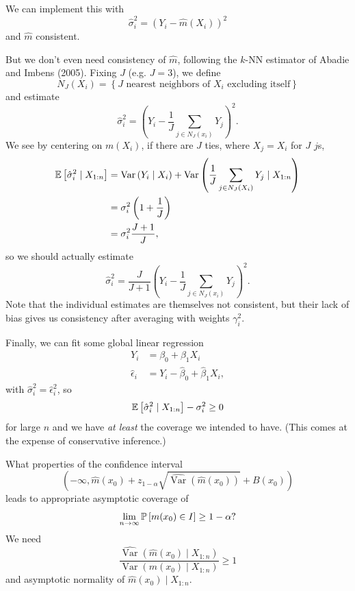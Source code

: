 \begin{example}	We can implement this with \[
		\hat{\sigma}_i^2 = \left( Y_i - \hat{m}(X_i) \right)^2
	\]  and $\hat{m}$ consistent.

	But we don't even need consistency of $\hat{m}$, following the $k$-NN estimator of Abadie and Imbens (2005). Fixing $J$ (e.g. $J=3$), we define \[
		N_J(X_i) = \left\{J \text{ nearest neighbors of $X_i$ excluding itself}\right\}
	\] and estimate \[
		\hat{\sigma}_i^2 = \left( Y_i - \frac{1}{J} \sum\limits_{j\in N_J(x_i)}^{} Y_j \right)^2
	.\] We see by centering on $m(X_i)$, if there are $J$ ties, where $X_j = X_i$ for $J$ $j$s,
	\begin{align*}
		\E\left[\hat{\sigma}_i^2 \mid X_{1:n}\right]
		&= \operatorname{Var}\left(Y_i \mid X_i\right) + \operatorname{Var}\left(\frac{1}{J} \sum\limits_{j \in N_J(X_i)}^{} Y_j \mid X_{1:n}\right)\\
		&= \sigma_i^2 \left( 1 + \frac{1}{J} \right) \\
		&= \sigma_i^2 \frac{J+1}{J}
	,\end{align*}
	so we should actually estimate \[
		\hat{\sigma}_i^2 = \frac{J}{J+1} \left( Y_i - \frac{1}{J} \sum\limits_{j\in N_J(x_i)}^{} Y_j \right)^2
	.\] 
	Note that the individual estimates are themselves not consistent, but their lack of bias gives us consistency after averaging with weights $\gamma_i^2$.


	Finally, we can fit some global linear regression 
	\begin{align*}
		Y_i &= \beta_0 + \beta_1 X_i \\
		\hat{\epsilon}_i &= Y_i - \hat{\beta}_0 + \hat{\beta}_1X_i
	,\end{align*}
	with $\hat{\sigma}_i^2 = \hat{\epsilon}_i^2$, so \[
		\E\left[\hat{\sigma}_i^2 \mid X_{1:n}\right] - \sigma_i^2 \ge 0
	\] for large $n$ and we have \emph{at least} the coverage we intended to have. (This comes at the expense of conservative inference.)
\end{example}

What properties of the confidence interval \[
	\left( -\infty, \hat{m}(x_0) + z_{1-\alpha} \sqrt{\widehat{\operatorname{Var}}(\hat{m}(x_0))} + B(x_0)  \right)
\] leads to appropriate asymptotic coverage of \[
	\lim\limits_{n \to \infty} \P\left[m(x_0) \in I\right]  \ge 1-\alpha
?\]
We need \[
	\frac{\widehat{\operatorname{Var}}(\hat{m}(x_0) \mid X_{1:n})}{\operatorname{Var}\left(m(x_0)\mid X_{1:n}\right)} \ge 1
\] 
and asymptotic normality of $\hat{m}(x_0) \mid X_{1:n}$.


